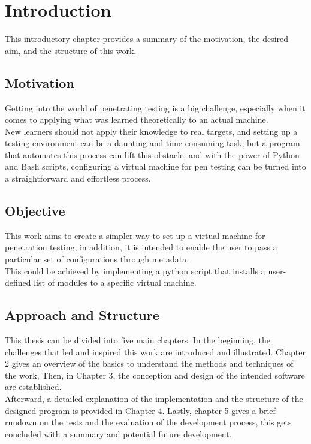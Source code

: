 \chapter{Introduction}
This introductory chapter provides a summary of the motivation, the desired aim, and the structure of this work.

\section{Motivation}
Getting into the world of penetrating testing is a big challenge, especially when it comes to applying what was learned theoretically to an actual machine.\\
New learners should not apply their knowledge to real targets, and setting up a testing environment can be a daunting and time-consuming task, but a program that automates this process can lift this obstacle, and with the power of Python and Bash scripts, configuring a virtual machine for pen testing can be turned into a straightforward and effortless process.

\section{Objective}
This work aims to create a simpler way to set up a virtual machine for penetration testing, in addition, it is intended to enable the user to pass a particular set of configurations through metadata.\\
This could be achieved by implementing a python script that installs a user-defined list of modules to a specific virtual machine.

\section{Approach and Structure}
This thesis can be divided into five main chapters. In the beginning, the challenges that led and inspired this work are introduced and illustrated. Chapter 2 gives an overview of the basics to understand the methods and techniques of the work, Then, in Chapter 3, the conception and design of the intended software are established.\\
Afterward, a detailed explanation of the implementation and the structure of the designed program is provided in Chapter 4. Lastly, chapter 5 gives a brief rundown on the tests and the evaluation of the development process, this gets concluded with a summary and potential future development.
